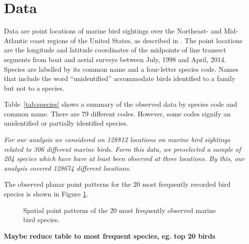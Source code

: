 \documentclass{statsoc}
\begin{document}
\section{Data}




Data are point locations of marine bird sightings over the Northeast- and Mid-Atlantic coast regions of the United States, as described in \cite{Balderama2016}. The point locations are the longitude and latitude coordinates of the midpoints of line transect segments from boat and aerial surveys between July, 1998 and April, 2014. Species are labelled by its common name and a four-letter species code. Names that include the word ``unidentified'' accommodate birds identified to a family but not to a species. 

Table~\ref{tab:species} shows a summary of the observed data by species code and common name. There are 79 different codes. However, some codes signify an unidentified or partially identified species.

\textit{ For our analysis we considered  on 128812 locations on marine bird sightings related to 306 different marine birds. Form this data, we preselected a sample of 204 species which have have at least been observed at three locations. By this, our analysis covered 128674 different locations.}

The observed planar point patterns for the $20$ most frequently recorded bird species is shown in Figure \ref{fig:birds20}.
 
\begin{figure}
\centering
{}
      \caption{\label{fig:birds20} Spatial point patterns of the $20$ most frequently observed marine bird species.}
\end{figure} 


\textbf{Maybe reduce table to most frequent species, eg. top 20 birds}
\end{document}
